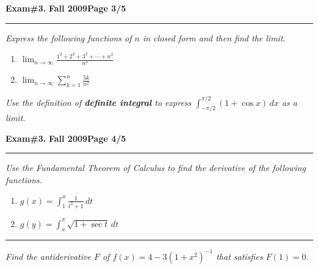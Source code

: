 \documentclass[12pt]{article}
\begin{document}
\hfill{\large\bf Exam\#3.}\hfill{\large\bf
  Fall 2009}\hfill{\large\bf Page 3/5}\hrule

\bigskip
{\problem[20 pts] \em Express the following functions of $n$ in closed
  form and then find the limit.}
\begin{enumerate}
\item  $\displaystyle{\lim_{n \to \infty} \frac{1^2+2^2+3^2+ \dotsb +
      n^2}{n^3}}$
\vspace{5cm}
\item  $\displaystyle{\lim_{n \to \infty} \sum_{k=1}^n \frac{5k}{n^2}}$
\vspace{5cm}
\end{enumerate}
{\problem[10 pts] \em Use the definition of \textbf{definite integral} to
  express $\int_{-\pi/2}^{\pi/2} (1+ \cos x)\, dx$ as a limit.}
\newpage

\hfill{\large\bf Exam\#3.}\hfill{\large\bf
  Fall 2009}\hfill{\large\bf Page 4/5}\hrule

\bigskip
{\problem[10 pts] \em Use the Fundamental Theorem of Calculus to find
  the derivative of the following functions.}
\begin{enumerate}
\item $\displaystyle{g(x) = \int_1^x \frac{1}{t^3+1}\, dt}$
\vspace{2cm}
\begin{flushright}
\end{flushright}
\item $\displaystyle{g(y) = \int_x^\pi \sqrt{1+ \sec t}\, dt}$
\vspace{2cm}
\begin{flushright}
\end{flushright}
\end{enumerate}
\hrule
{\problem[10 pts] \em Find the antiderivative $F$ of $f(x) =
  4-3(1+x^2)^{-1}$ that satisfies $F(1) = 0$.} 
\vspace{5cm}
\begin{flushright}
\end{flushright}
\newpage
\end{document}
